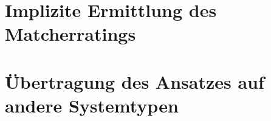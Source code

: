 \section{Implizite Ermittlung des Matcherratings}
\section{Übertragung des Ansatzes auf andere Systemtypen}
